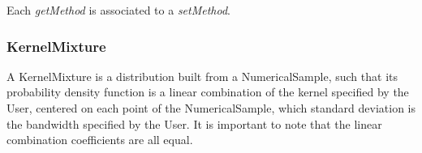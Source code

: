 Each  \textit{getMethod}  is associated to a \textit{setMethod}.




\newpage
\subsubsection{KernelMixture}


A KernelMixture is a distribution built from a NumericalSample, such that its probability density function is a linear combination of the kernel specified by the User, centered on each point of the NumericalSample, which standard deviation is the bandwidth specified by the User.
It is important to note that the linear combination coefficients are all equal.



